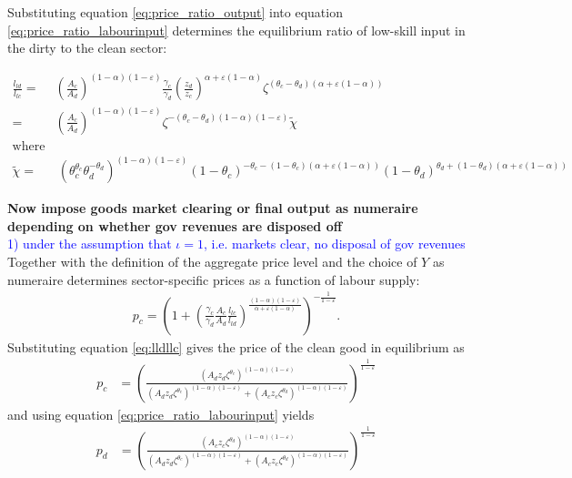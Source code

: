 Substituting equation \ref{eq:price_ratio_output} into equation \ref{eq:price_ratio_labourinput} determines the equilibrium ratio of low-skill input in the dirty to the clean sector: 

\begin{align}
\frac{l_{ld}}{l_{lc}}=&\left(\frac{A_c}{A_d}\right)^{(1-\alpha)(1-\varepsilon)}\frac{\gamma_c}{\gamma_d}\left(\frac{z_d}{z_c}\right)^{\alpha+\varepsilon(1-\alpha)}\zeta^{(\theta_c-\theta_d)(\alpha+\varepsilon(1-\alpha))}\nonumber\\
=& \left(\frac{A_c}{A_d}\right)^{(1-\alpha)(1-\varepsilon)}\zeta^{-(\theta_c-\theta_d)(1-\alpha)(1-\varepsilon)}\tilde{\chi}\label{eq:lldllc}\\
\text{where}&\\
 \tilde{\chi}= &\  (\theta_c^{\theta_c}\theta_d^{-\theta_d})^{(1-\alpha) (1-\varepsilon)}(1-\theta_c)^{-\theta_c-(1-\theta_c)(\alpha+\varepsilon(1-\alpha))}(1-\theta_d)^{\theta_d+(1-\theta_d)(\alpha+\varepsilon(1-\alpha))}\nonumber
	\end{align}


\noindent \textbf{Now impose goods market clearing or final output as numeraire depending on whether gov revenues are disposed off}\\
\textcolor{blue}{1) under the assumption that $\iota =1$, i.e. markets clear, no disposal of gov revenues}\\
Together with the definition of the aggregate price level and the choice of $Y$ as numeraire determines sector-specific prices as a function of labour supply:
\begin{align*}
p_c= \left(1+\left(\frac{\gamma_c}{\gamma_d}\frac{A_c}{A_d}\frac{l_{lc}}{l_{ld}}\right)^{\frac{(1-\alpha)(1-\varepsilon)}{\alpha+\varepsilon(1-\alpha)}}\right)^{-\frac{1}{1-\varepsilon}}.
\end{align*}
 Substituting equation \ref{eq:lldllc} gives the price of the clean good in equilibrium as
 \begin{align}\label{eq:eq_pc}
	p_c%
	&= \left(\frac{\left(A_dz_d\zeta^{\theta_c}\right)^{(1-\alpha)(1-\varepsilon)}}{\left(A_dz_d\zeta^{\theta_c}\right)^{(1-\alpha)(1-\varepsilon)}+\left(A_cz_c\zeta^{\theta_d}\right)^{(1-\alpha)(1-\varepsilon)}}\right)^{\frac{1}{1-\varepsilon}}
 \end{align}
and using equation \ref{eq:price_ratio_labourinput} yields
\begin{align}\label{eq:eq_pd}
p_d%
	&= \left(\frac{\left(A_cz_c\zeta^{\theta_d}\right)^{(1-\alpha)(1-\varepsilon)}}{\left(A_dz_d\zeta^{\theta_c}\right)^{(1-\alpha)(1-\varepsilon)}+\left(A_cz_c\zeta^{\theta_d}\right)^{(1-\alpha)(1-\varepsilon)}}\right)^{\frac{1}{1-\varepsilon}} 
\end{align}

